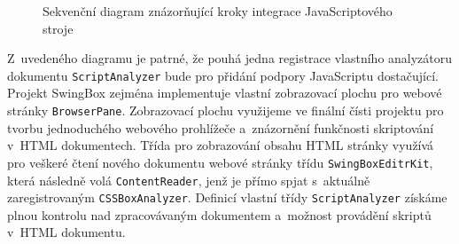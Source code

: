\begin{figure}[H]
  \begin{center}
    \caption{Sekvenční diagram znázorňující kroky integrace JavaScriptového stroje}
    \label{Figure.SwingBoxIntegrationDesign}
  \end{center}
\end{figure}

Z~uvedeného diagramu je patrné, že pouhá jedna registrace vlastního analyzátoru dokumentu \texttt{ScriptAnalyzer} bude pro přidání podpory JavaScriptu dostačující. Projekt SwingBox zejména implementuje vlastní zobrazovací plochu pro webové stránky \texttt{BrowserPane}. Zobrazovací plochu využijeme ve finální čísti projektu pro tvorbu jednoduchého webového prohlížeče a~znázornění funkčnosti skriptování v~HTML dokumentech. Třída pro zobrazování obsahu HTML stránky využívá pro veškeré čtení nového dokumentu webové stránky třídu \texttt{SwingBoxEditrKit}, která následně volá \texttt{ContentReader}, jenž je přímo spjat s~aktuálně zaregistrovaným \texttt{CSSBoxAnalyzer}. Definicí vlastní třídy \texttt{ScriptAnalyzer} získáme plnou kontrolu nad zpracovávaným dokumentem a~možnost provádění skriptů v~HTML dokumentu. 


